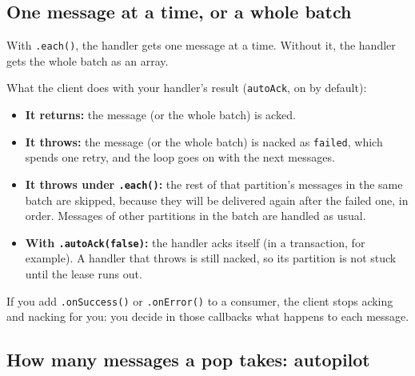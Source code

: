 \subsection{One message at a time, or a whole batch}

With \texttt{.each()}, the handler gets one message at a time. Without it, the handler gets the
whole batch as an array.


What the client does with your handler's result (\texttt{autoAck}, on by default):

\begin{itemize}
\item \textbf{It returns:} the message (or the whole batch) is acked.
\item \textbf{It throws:} the message (or the whole batch) is nacked as \texttt{failed}, which
spends one retry, and the loop goes on with the next messages.
\item \textbf{It throws under \texttt{.each()}:} the rest of that partition's messages in the same
batch are skipped, because they will be delivered again after the failed one, in order. Messages of
other partitions in the batch are handled as usual.
\item \textbf{With \texttt{.autoAck(false)}:} the handler acks itself (in a transaction, for
example). A handler that throws is still nacked, so its partition is not stuck until the lease
runs out.
\end{itemize}


If you add \texttt{.onSuccess()} or \texttt{.onError()} to a consumer, the client stops acking and
nacking for you: you decide in those callbacks what happens to each message.



\subsection{How many messages a pop takes: autopilot}

